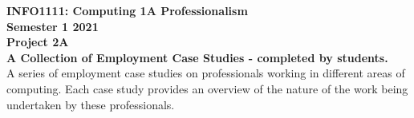 \documentclass[a4paper, 11pt]{report}
\begin{document}
\begin{titlepage}
\center 
\textbf{\huge INFO1111: Computing 1A Professionalism}\\[1cm]
\textbf{\huge Semester 1 2021}\\[1cm]
\textbf{\huge Project 2A}\\[3cm]

\textbf{\huge A Collection of Employment Case Studies - completed by students.}
\\[1cm]
\large A series of employment case studies on professionals working in different areas of computing.
Each case study provides an overview of the nature of the work being undertaken by these professionals.

\end{titlepage}

\tableofcontents
\end{document}
